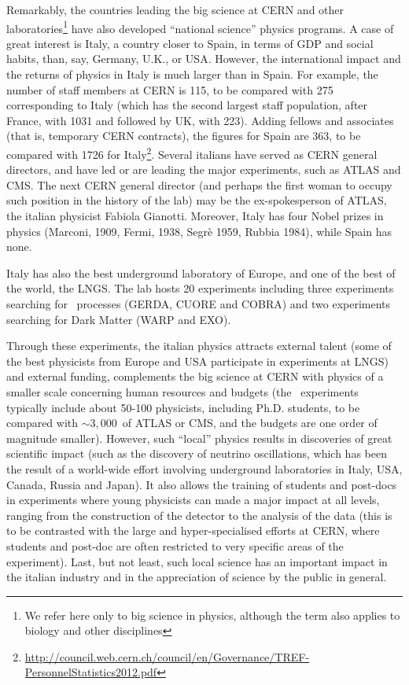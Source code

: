 Remarkably, the countries leading the big science at CERN and other laboratories\footnote{We refer here only to big science in physics, although the term also applies to biology and other disciplines} have also developed ``national science'' physics programs. A case of great interest is Italy, a country closer to Spain, in terms of GDP and social habits, than, say, Germany, U.K., or USA. However, the international impact and the returns of physics in Italy is much larger than in Spain. For example, the number of staff members at CERN is 115, to be compared with 275 corresponding to Italy (which has the second largest staff population, after France, with 1031 and followed by UK, with 223). Adding fellows and associates (that is, temporary CERN contracts), the figures for Spain are 363, to be compared with 1726 for Italy\footnote{\href{http://council.web.cern.ch/council/en/Governance/TREF-PersonnelStatistics2012.pdf}{http://council.web.cern.ch/council/en/Governance/TREF-PersonnelStatistics2012.pdf}}. Several italians have served as CERN general directors, and have led or are leading the major experiments, such as ATLAS and CMS. The next CERN general director (and perhaps the first woman to occupy such position in the history of the lab) may be the ex-spokesperson of ATLAS, the italian physicist Fabiola Gianotti. Moreover, Italy has four Nobel prizes in physics (Marconi, 1909, Fermi, 1938, Segrè 1959, Rubbia 1984), while Spain has none. 

Italy has also the best underground laboratory of Europe, and one of the best of the world, the LNGS. The lab hosts 20 experiments including three experiments searching for \bbonu\ processes (GERDA, CUORE and COBRA) and two experiments searching for Dark Matter (WARP and EXO). 

Through these experiments, the italian physics attracts external talent (some of the best physicists from Europe and USA participate in experiments at LNGS) and external funding, complements the big science at CERN with physics of a smaller scale concerning human resources and budgets (the \bbonu\ experiments typically include about 50-100 physicists, including Ph.D. students, to be compared with $\sim 3,000$~of ATLAS or CMS, and the budgets are one order of magnitude smaller). However, such ``local'' physics results in discoveries of great scientific impact (such as the discovery of neutrino oscillations, which has been the result of a world-wide effort involving underground laboratories in Italy, USA, Canada, Russia and Japan). It also allows the training of students and post-docs in experiments where young physicists can made a major impact at all levels, ranging from the construction of the detector to the analysis of the data (this is to be contrasted with the large and hyper-specialised efforts at CERN, where students and post-doc are often restricted to very specific areas of the experiment). Last, but not least, such local science has an important impact in the italian industry and in the appreciation of science by the public in general. 

